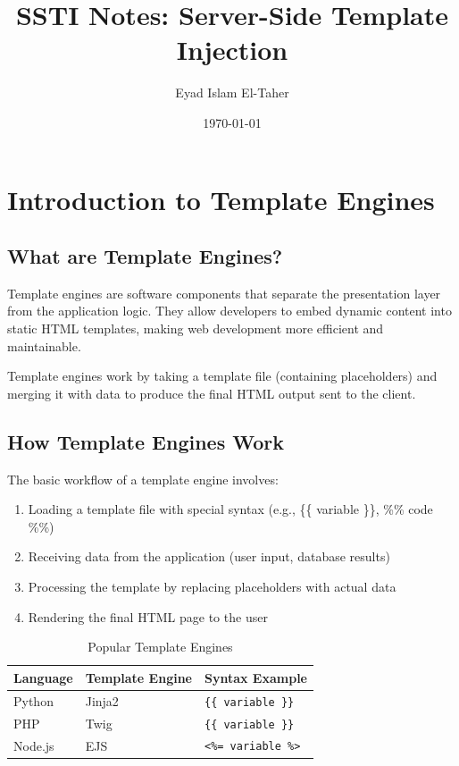 \documentclass{article}
\title{SSTI Notes: Server-Side Template Injection}
\author{Eyad Islam El-Taher}
\date{\today}
\begin{document}
\maketitle


\section{Introduction to Template Engines}

\subsection{What are Template Engines?}
Template engines are software components that separate the presentation layer from the application logic. They allow developers to embed dynamic content into static HTML templates, making web development more efficient and maintainable.

\begin{infobox}
Template engines work by taking a template file (containing placeholders) and merging it with data to produce the final HTML output sent to the client.
\end{infobox}

\subsection{How Template Engines Work}
The basic workflow of a template engine involves:
\begin{enumerate}
    \item Loading a template file with special syntax (e.g., \{\{ variable \}\}, \%\% code \%\%)
    \item Receiving data from the application (user input, database results)
    \item Processing the template by replacing placeholders with actual data
    \item Rendering the final HTML page to the user
\end{enumerate}

\begin{table}[h]
\centering
\begin{tabular}{@{} l l l @{}}
\toprule
\textbf{Language} & \textbf{Template Engine} & \textbf{Syntax Example} \\
\midrule
Python & Jinja2 & \texttt{\{\{ variable \}\}} \\
PHP & Twig & \texttt{\{\{ variable \}\}} \\
Node.js & EJS & \texttt{<\%= variable \%>} \\
\bottomrule
\end{tabular}
\caption{Popular Template Engines}
\end{table}
\end{document}

